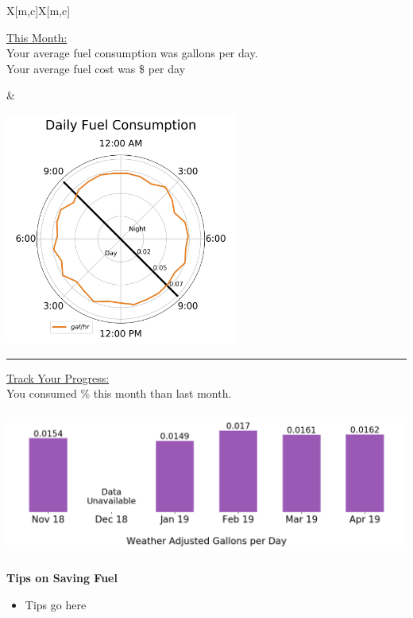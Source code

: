 \documentclass[12pt,a4paper]{article}
\begin{document}
\begin{tabu}{X[m,c]X[m,c]}

\begin{minipage}{\linewidth}
\underline{This Month:}\\

Your average fuel consumption was {\fuelperday} gallons per day.\\

Your average fuel cost was \${\fuelcostperday} per day\\
\end{minipage}

&

\begin{minipage}{\linewidth}
\includegraphics[height = 3in]{monthly_polar_plot.png}
\end{minipage}


\end{tabu}

\rule{\textwidth}{1pt}
\newline

\underline{Track Your Progress:}\\

You consumed {\progress}\% {\progressmoreless} this month than last month.\\
\begin{center}
\includegraphics[height= 1.875in]{monthly_track_your_progress.png}
\end{center}

\newpage
\renewcommand{\headsep}{14pt}
\fancyfoot{}
\begin{center}
\textbf{\Huge{Tips on Saving Fuel}}
\end{center}

\vspace{12pt}
\begin{itemize}
\item Tips go here
\end{itemize}
\end{document}

